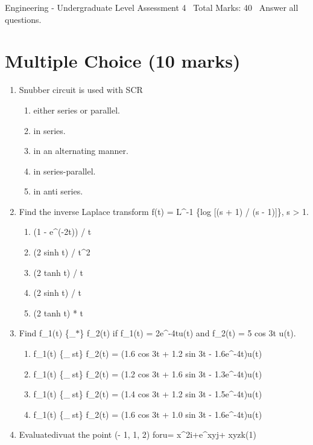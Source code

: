 \documentclass[12pt]{article}
\begin{document}
\begin{center}
Engineering - Undergraduate Level Assessment 4 \
Total Marks: 40 \
Answer all questions.
\end{center}

\section*{Multiple Choice (10 marks)}
\begin{enumerate}[label=\arabic*.]
\item Snubber circuit is used with SCR
\begin{enumerate}[label=(\alph*)]
    \item either series or parallel.
    \item in series.
    \item in an alternating manner.
    \item in series-parallel.
    \item in anti series.
\end{enumerate}
\item Find the inverse Laplace transform f(t) = L\^{}-1 \{log [(s + 1) / (s - 1)]\}, s \textgreater{} 1.
\begin{enumerate}[label=(\alph*)]
    \item (1 - e\^{}(-2t)) / t
    \item (2 sinh t) / t\^{}2
    \item (2 tanh t) / t
    \item (2 sinh t) / t
    \item (2 tanh t) * t
\end{enumerate}
\item Find f\_1(t) \{\_\ensuremath{\ast}\} f\_2(t) if f\_1(t) = 2e\^{}-4tu(t) and f\_2(t) = 5 cos 3t u(t).
\begin{enumerate}[label=(\alph*)]
    \item f\_1(t) \{\_st\} f\_2(t) = (1.6 cos 3t + 1.2 sin 3t - 1.6e\^{}-4t)u(t)
    \item f\_1(t) \{\_st\} f\_2(t) = (1.2 cos 3t + 1.6 sin 3t - 1.3e\^{}-4t)u(t)
    \item f\_1(t) \{\_st\} f\_2(t) = (1.4 cos 3t + 1.2 sin 3t - 1.5e\^{}-4t)u(t)
    \item f\_1(t) \{\_st\} f\_2(t) = (1.6 cos 3t + 1.0 sin 3t - 1.6e\^{}-4t)u(t)
\end{enumerate}
\item Evaluatedivuat the point (- 1, 1, 2) foru= x\^{}2i+e\^{}xyj+ xyzk(1)
\begin{enumerate}[label=(\alph*)]

\end{enumerate}
\end{enumerate}
\end{document}
